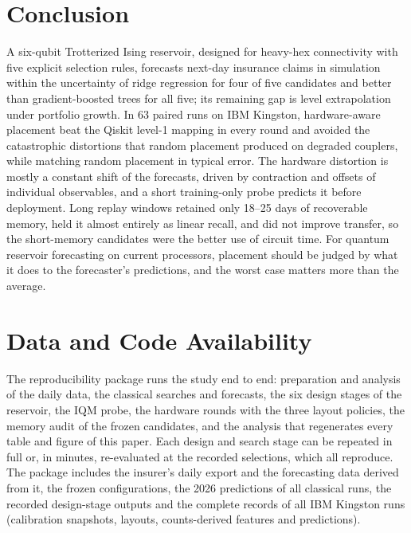 \documentclass[journal]{IEEEtran}
\begin{document}
\section{Conclusion}
A six-qubit Trotterized Ising reservoir, designed for heavy-hex connectivity with five explicit selection rules, forecasts next-day insurance claims in simulation within the uncertainty of ridge regression for four of five candidates and better than gradient-boosted trees for all five; its remaining gap is level extrapolation under portfolio growth. In 63 paired runs on IBM Kingston, hardware-aware placement beat the Qiskit level-1 mapping in every round and avoided the catastrophic distortions that random placement produced on degraded couplers, while matching random placement in typical error. The hardware distortion is mostly a constant shift of the forecasts, driven by contraction and offsets of individual observables, and a short training-only probe predicts it before deployment. Long replay windows retained only 18--25 days of recoverable memory, held it almost entirely as linear recall, and did not improve transfer, so the short-memory candidates were the better use of circuit time. For quantum reservoir forecasting on current processors, placement should be judged by what it does to the forecaster's predictions, and the worst case matters more than the average.

\section*{Data and Code Availability}
The reproducibility package runs the study end to end: preparation and analysis of the daily data, the classical searches and forecasts, the six design stages of the reservoir, the IQM probe, the hardware rounds with the three layout policies, the memory audit of the frozen candidates, and the analysis that regenerates every table and figure of this paper. Each design and search stage can be repeated in full or, in minutes, re-evaluated at the recorded selections, which all reproduce. The package includes the insurer's daily export and the forecasting data derived from it, the frozen configurations, the 2026 predictions of all classical runs, the recorded design-stage outputs and the complete records of all IBM Kingston runs (calibration snapshots, layouts, counts-derived features and predictions).

\appendices
\end{document}
